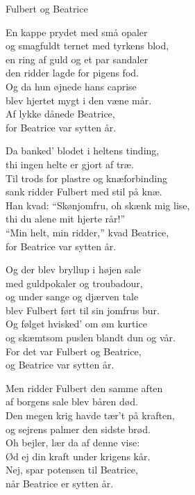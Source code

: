 \begin{song}{Fulbert og Beatrice}
  \begin{SBVerse}
    En kappe prydet med små opaler\\
    og smagfuldt ternet med tyrkens blod,\\
    en ring af guld og et par sandaler\\
    den ridder lagde for pigens fod.\\\medskip
    Og da hun øjnede hans caprise\\
    blev hjertet mygt i den væne mår.\\
    Af lykke dånede Beatrice,\\
    for Beatrice var sytten år.
  \end{SBVerse}

  \begin{SBVerse}
    Da banked' blodet i heltens tinding,\\
    thi ingen helte er gjort af træ.\\
    Til trods for plastre og knæforbinding\\
    sank ridder Fulbert med stil på knæ.\\\medskip
    Han kvad: ``Skønjomfru, oh skænk mig lise,\\
    thi du alene mit hjerte rår!''\\
    ``Min helt, min ridder,'' kvad Beatrice,\\
    for Beatrice var sytten år.
  \end{SBVerse}

  \begin{SBVerse}
    Og der blev bryllup i højen sale\\
    med guldpokaler og troubadour,\\
    og under sange og djærven tale\\
    blev Fulbert ført til sin jomfrus bur.\\\medskip
    Og følget hvisked' om øm kurtice\\
    og skæmtsom puslen blandt dun og vår.\\
    For det var Fulbert og Beatrice,\\
    og Beatrice var sytten år.
  \end{SBVerse}

  \begin{SBVerse}
    Men ridder Fulbert den samme aften\\
    af borgens sale blev båren død.\\
    Den megen krig havde tær't på kraften,\\
    og sejrens palmer den sidste brød.\\\medskip
    Oh bejler, lær da af denne vise:\\
    Ød ej din kraft under krigens kår.\\
    Nej, spar potensen til Beatrice,\\
    når Beatrice er sytten år.
  \end{SBVerse}
\end{song}